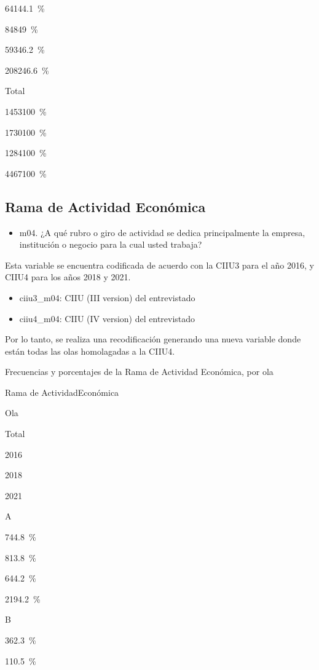 \documentclass[
  12pt,
]{book}
\providecommand{\tightlist}{%
  \setlength{\itemsep}{0pt}\setlength{\parskip}{0pt}}
\begin{document}
{641}{44.1~\%}

{848}{49~\%}

{593}{46.2~\%}

{2082}{46.6~\%}

Total

{1453}{100~\%}

{1730}{100~\%}

{1284}{100~\%}

{4467}{100~\%}

\hypertarget{rama-de-actividad-econuxf3mica}{%
\subsection{Rama de Actividad Económica}\label{rama-de-actividad-econuxf3mica}}

\begin{itemize}
\tightlist
\item
  m04. ¿A qué rubro o giro de actividad se dedica principalmente la empresa, institución o negocio para la cual usted trabaja?
\end{itemize}

Esta variable se encuentra codificada de acuerdo con la CIIU3 para el año 2016, y CIIU4 para los años 2018 y 2021.

\begin{itemize}
\tightlist
\item
  ciiu3\_m04: CIIU (III version) del entrevistado
\item
  ciiu4\_m04: CIIU (IV version) del entrevistado
\end{itemize}

Por lo tanto, se realiza una recodificación generando una nueva variable donde están todas las olas homolagadas a la CIIU4.

Frecuencias y porcentajes de la Rama de Actividad Económica, por ola

Rama de ActividadEconómica

Ola

Total

2016

2018

2021

A

{74}{4.8~\%}

{81}{3.8~\%}

{64}{4.2~\%}

{219}{4.2~\%}

B

{36}{2.3~\%}

{11}{0.5~\%}
\end{document}
